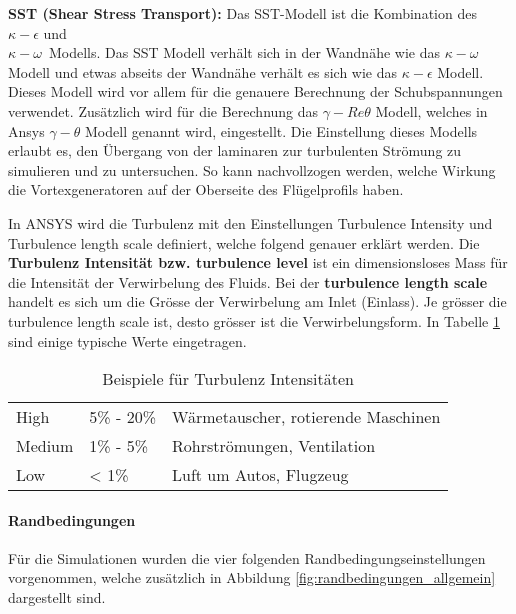 \textbf{SST (Shear Stress Transport):} Das SST-Modell ist die
Kombination des $\kappa-\epsilon$ und\\ $\kappa-\omega$~Modells. Das SST Modell verhält sich in der Wandnähe
wie das $\kappa-\omega$ Modell und etwas abseits der Wandnähe
verhält es sich wie das $\kappa-\epsilon$ Modell. Dieses Modell wird
vor allem für die genauere Berechnung der Schubspannungen
verwendet. Zusätzlich wird für die Berechnung das
$\gamma-Re \theta$ Modell, welches in Ansys $\gamma-\theta$
Modell genannt wird, eingestellt. Die Einstellung dieses Modells
erlaubt es, den Übergang von der laminaren zur turbulenten Strömung zu
simulieren und zu untersuchen. So kann nachvollzogen werden, welche Wirkung die Vortexgeneratoren auf der Oberseite des Flügelprofils haben.

In ANSYS wird die Turbulenz mit den Einstellungen \guillemotleft{}Turbulence Intensity\guillemotright{} und \guillemotleft{}Turbulence length scale\guillemotright{} definiert, welche folgend genauer erklärt werden. Die \textbf{Turbulenz Intensität bzw. turbulence level} ist ein dimensionsloses Mass für die Intensität der Verwirbelung des Fluids. Bei der \textbf{turbulence length scale} handelt es sich um die Grösse der Verwirbelung am Inlet (Einlass). Je grösser die turbulence length scale ist, desto grösser ist die Verwirbelungsform. In  Tabelle \ref{tab:intensitaet} sind einige typische Werte eingetragen.

\begin{table}[htb!]
\begin{center}
    \begin{tabular}{lll}
    High   & 5\% - 20\% & Wärmetauscher, rotierende Maschinen \\
    Medium & 1\% - 5\%  & Rohrströmungen, Ventilation         \\
    Low    & < 1\%      & Luft um Autos, Flugzeug             \\

    \end{tabular}
    \end{center}
           \caption{Beispiele für Turbulenz Intensitäten \cite[S. 5]{Backus66}}
    \label{tab:intensitaet}
\end{table}

\newpage

\paragraph{Randbedingungen}
\label{para:randbedingungen_allgemein}
$\;$\\
Für die Simulationen wurden die vier folgenden Randbedingungseinstellungen vorgenommen, welche zusätzlich in Abbildung \ref{fig:randbedingungen_allgemein} dargestellt sind.\\

